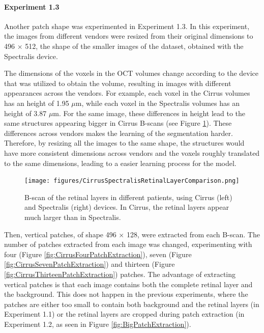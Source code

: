 \paragraph{Experiment 1.3}
Another patch shape was experimented in Experiment 1.3. In this experiment, the images from different vendors were resized from their original dimensions to 496 $\times$ 512, the shape of the smaller images of the dataset, obtained with the Spectralis device. 
\par
The dimensions of the voxels in the OCT volumes change according to the device that was utilized to obtain the volume, resulting in images with different appearances across the vendors. For example, each voxel in the Cirrus volumes has an height of 1.95 $\mu$m, while each voxel in the Spectralis volumes has an height of 3.87 $\mu$m. For the same image, these differences in height lead to the same structures appearing bigger in Cirrus B-scans (see Figure \ref{fig:CirrusSpectralisRetinalLayerComparison}). These differences across vendors makes the learning of the segmentation harder. Therefore, by resizing all the images to the same shape, the structures would have more consistent dimensions across vendors and the voxels roughly translated to the same dimensions, leading to a easier learning process for the model.

\begin{figure}[!ht]
	\centering
	\texttt{[image: figures/CirrusSpectralisRetinalLayerComparison.png]}
	\caption{B-scan of the retinal layers in different patients, using Cirrus (left) and Spectralis (right) devices. In Cirrus, the retinal layers appear much larger than in Spectralis.}
	\label{fig:CirrusSpectralisRetinalLayerComparison}
\end{figure}

Then, vertical patches, of shape 496 $\times$ 128, were extracted from each B-scan. The number of patches extracted from each image was changed, experimenting with four (Figure \ref{fig:CirrusFourPatchExtraction}), seven (Figure \ref{fig:CirrusSevenPatchExtraction}) and thirteen (Figure \ref{fig:CirrusThirteenPatchExtraction}) patches. The advantage of extracting vertical patches is that each image contains both the complete retinal layer and the background. This does not happen in the previous experiments, where the patches are either too small to contain both background and the retinal layers (in Experiment 1.1) or the retinal layers are cropped during patch extraction (in Experiment 1.2, as seen in Figure \ref{fig:BigPatchExtraction}).

